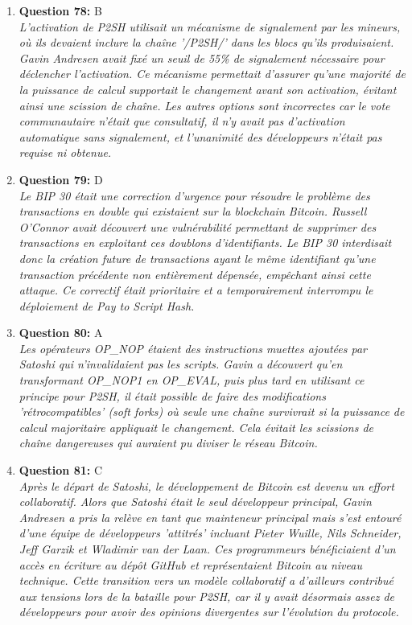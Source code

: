 \documentclass[12pt,a4paper]{article}
\begin{document}
\begin{enumerate}
\item \textbf{Question 78:} B
\\ \textit{L'activation de P2SH utilisait un mécanisme de signalement par les mineurs, où ils devaient inclure la chaîne '/P2SH/' dans les blocs qu'ils produisaient. Gavin Andresen avait fixé un seuil de 55\% de signalement nécessaire pour déclencher l'activation. Ce mécanisme permettait d'assurer qu'une majorité de la puissance de calcul supportait le changement avant son activation, évitant ainsi une scission de chaîne. Les autres options sont incorrectes car le vote communautaire n'était que consultatif, il n'y avait pas d'activation automatique sans signalement, et l'unanimité des développeurs n'était pas requise ni obtenue.}

\item \textbf{Question 79:} D
\\ \textit{Le BIP 30 était une correction d'urgence pour résoudre le problème des transactions en double qui existaient sur la blockchain Bitcoin. Russell O'Connor avait découvert une vulnérabilité permettant de supprimer des transactions en exploitant ces doublons d'identifiants. Le BIP 30 interdisait donc la création future de transactions ayant le même identifiant qu'une transaction précédente non entièrement dépensée, empêchant ainsi cette attaque. Ce correctif était prioritaire et a temporairement interrompu le déploiement de Pay to Script Hash.}

\item \textbf{Question 80:} A
\\ \textit{Les opérateurs OP_NOP étaient des instructions muettes ajoutées par Satoshi qui n'invalidaient pas les scripts. Gavin a découvert qu'en transformant OP_NOP1 en OP_EVAL, puis plus tard en utilisant ce principe pour P2SH, il était possible de faire des modifications 'rétrocompatibles' (soft forks) où seule une chaîne survivrait si la puissance de calcul majoritaire appliquait le changement. Cela évitait les scissions de chaîne dangereuses qui auraient pu diviser le réseau Bitcoin.}

\item \textbf{Question 81:} C
\\ \textit{Après le départ de Satoshi, le développement de Bitcoin est devenu un effort collaboratif. Alors que Satoshi était le seul développeur principal, Gavin Andresen a pris la relève en tant que mainteneur principal mais s'est entouré d'une équipe de développeurs 'attitrés' incluant Pieter Wuille, Nils Schneider, Jeff Garzik et Wladimir van der Laan. Ces programmeurs bénéficiaient d'un accès en écriture au dépôt GitHub et représentaient Bitcoin au niveau technique. Cette transition vers un modèle collaboratif a d'ailleurs contribué aux tensions lors de la bataille pour P2SH, car il y avait désormais assez de développeurs pour avoir des opinions divergentes sur l'évolution du protocole.}


\end{enumerate}
\end{document}
